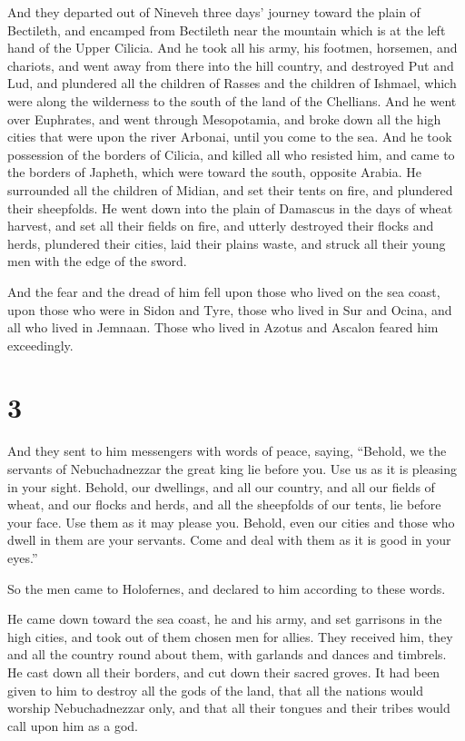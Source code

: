  And they departed out of Nineveh three days' journey
toward the plain of Bectileth, and encamped from Bectileth near the
mountain which is at the left hand of the Upper Cilicia. 
And he took all his army, his footmen, horsemen, and chariots, and went
away from there into the hill country,  and destroyed Put
and Lud, and plundered all the children of Rasses and the children of
Ishmael, which were along the wilderness to the south of the land of the
Chellians.  And he went over Euphrates, and went through
Mesopotamia, and broke down all the high cities that were upon the river
Arbonai, until you come to the sea.  And he took
possession of the borders of Cilicia, and killed all who resisted him,
and came to the borders of Japheth, which were toward the south,
opposite Arabia.  He surrounded all the children of
Midian, and set their tents on fire, and plundered their sheepfolds.
 He went down into the plain of Damascus in the days of
wheat harvest, and set all their fields on fire, and utterly destroyed
their flocks and herds, plundered their cities, laid their plains waste,
and struck all their young men with the edge of the sword.

 And the fear and the dread of him fell upon those who
lived on the sea coast, upon those who were in Sidon and Tyre, those who
lived in Sur and Ocina, and all who lived in Jemnaan. Those who lived in
Azotus and Ascalon feared him exceedingly.

\hypertarget{section-2}{%
\section{3}\label{section-2}}

 And they sent to him messengers with words of peace,
saying,  ``Behold, we the servants of Nebuchadnezzar the
great king lie before you. Use us as it is pleasing in your sight.
 Behold, our dwellings, and all our country, and all our
fields of wheat, and our flocks and herds, and all the sheepfolds of our
tents, lie before your face. Use them as it may please you.
 Behold, even our cities and those who dwell in them are
your servants. Come and deal with them as it is good in your eyes.''

 So the men came to Holofernes, and declared to him
according to these words.

 He came down toward the sea coast, he and his army, and
set garrisons in the high cities, and took out of them chosen men for
allies.  They received him, they and all the country round
about them, with garlands and dances and timbrels.  He
cast down all their borders, and cut down their sacred groves. It had
been given to him to destroy all the gods of the land, that all the
nations would worship Nebuchadnezzar only, and that all their tongues
and their tribes would call upon him as a god.

